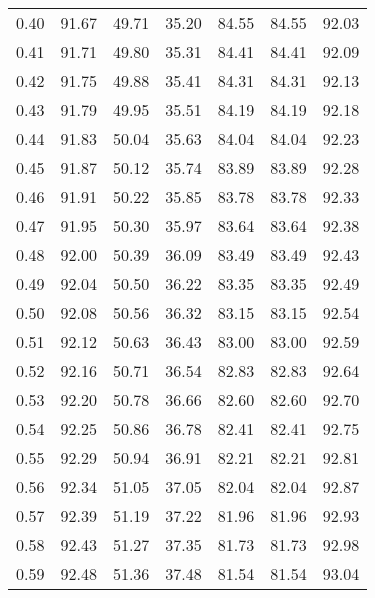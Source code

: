 \begin{tabular}{|c|c|c|c|c|c|c|}
      0.40 &     91.67 &     49.71 &      35.20 &   84.55 &      84.55 &         92.03 \\
      0.41 &     91.71 &     49.80 &      35.31 &   84.41 &      84.41 &         92.09 \\
      0.42 &     91.75 &     49.88 &      35.41 &   84.31 &      84.31 &         92.13 \\
      0.43 &     91.79 &     49.95 &      35.51 &   84.19 &      84.19 &         92.18 \\
      0.44 &     91.83 &     50.04 &      35.63 &   84.04 &      84.04 &         92.23 \\
      0.45 &     91.87 &     50.12 &      35.74 &   83.89 &      83.89 &         92.28 \\
      0.46 &     91.91 &     50.22 &      35.85 &   83.78 &      83.78 &         92.33 \\
      0.47 &     91.95 &     50.30 &      35.97 &   83.64 &      83.64 &         92.38 \\
      0.48 &     92.00 &     50.39 &      36.09 &   83.49 &      83.49 &         92.43 \\
      0.49 &     92.04 &     50.50 &      36.22 &   83.35 &      83.35 &         92.49 \\
      0.50 &     92.08 &     50.56 &      36.32 &   83.15 &      83.15 &         92.54 \\
      0.51 &     92.12 &     50.63 &      36.43 &   83.00 &      83.00 &         92.59 \\
      0.52 &     92.16 &     50.71 &      36.54 &   82.83 &      82.83 &         92.64 \\
      0.53 &     92.20 &     50.78 &      36.66 &   82.60 &      82.60 &         92.70 \\
      0.54 &     92.25 &     50.86 &      36.78 &   82.41 &      82.41 &         92.75 \\
      0.55 &     92.29 &     50.94 &      36.91 &   82.21 &      82.21 &         92.81 \\
      0.56 &     92.34 &     51.05 &      37.05 &   82.04 &      82.04 &         92.87 \\
      0.57 &     92.39 &     51.19 &      37.22 &   81.96 &      81.96 &         92.93 \\
      0.58 &     92.43 &     51.27 &      37.35 &   81.73 &      81.73 &         92.98 \\
      0.59 &     92.48 &     51.36 &      37.48 &   81.54 &      81.54 &         93.04 \\

\end{tabular}
